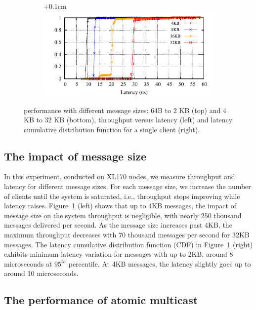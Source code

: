 \begin{figure}[ht]
\begin{subfigure}{\columnwidth}
  \end{subfigure}
  \begin{subfigure}{\columnwidth}
    \advance\leftskip+0.1cm
    \includegraphics[width=0.96\columnwidth]{figures/benchmark/graphs/figure-performance-vs-size-single-group-cdf-from-4k}
  \end{subfigure}
  \caption{\libname performance with different message sizes: 64B to 2 KB (top) and 4 KB to 32 KB (bottom), throughput versus latency (left) and latency cumulative distribution function for a single client (right).}
  \label{fig:1group_message_size}
\end{figure}

\subsection{The impact of message size}
\label{sec:evaluation:micro}

In this experiment, conducted on XL170 nodes, we measure \libname throughput and latency for different message sizes.
For each message size, we increase the number of clients until the system is saturated, i.e., throughput stops improving while latency raises.
Figure~\ref{fig:1group_message_size} (left) shows that up to 4KB messages, the impact of message size on the system throughput is negligible, with nearly 250 thousand messages delivered per second. 
As the message size increases past 4KB, the maximum throughput decreases with 70 thousand messages per second for 32KB messages.
The latency cumulative distribution function (CDF) in Figure~\ref{fig:1group_message_size} (right) exhibits minimum latency variation for messages with up to 2KB, around 8 microseconds at $95^{th}$ percentile. At 4KB messages, the latency slightly goes up to around 10 microseconds.


\subsection{The performance of atomic multicast}
\label{sec:evaluation:multicast}

